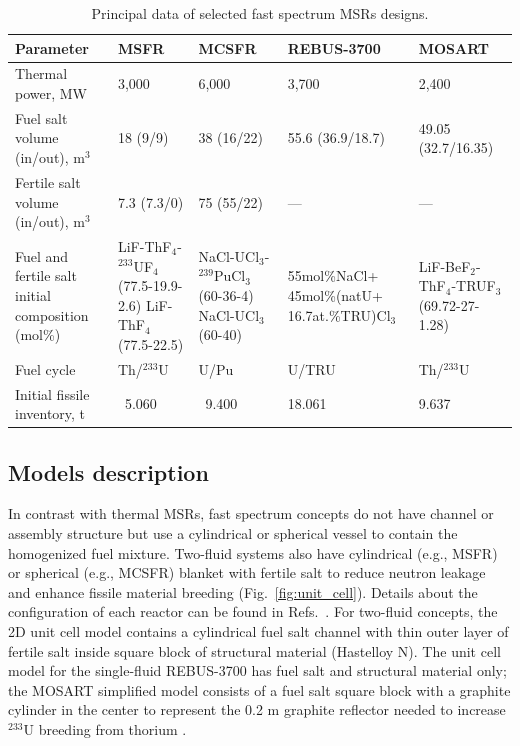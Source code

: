 \documentclass{anstrans}
\begin{document}
\begin{table}[!htb]
	\vspace{-0.15in}
  \centering
  \caption{Principal data of selected fast spectrum \glspl{MSR} designs.}
  \label{table:fsmsr_concepts} 
  \begin{tabular}{p{} p{} p{} p{} p{}} \toprule 
   Parameter & \gls{MSFR} & \gls{MCSFR} & REBUS-3700 & \gls{MOSART} \\ \midrule
   Thermal power, MW 				&  3,000 & 6,000     & 3,700 & 2,400   \\ 
   Fuel salt volume (in/out), m$^3$       &18 (9/9)& 38 (16/22)& 55.6 (36.9/18.7) & 49.05 (32.7/16.35) \\ 
   Fertile salt volume (in/out), m$^3$ & 7.3 (7.3/0) & 75 (55/22)    & --- & --- \\
   Fuel and fertile salt initial composition (mol\%) & LiF-ThF$_4$-$^{233}$UF$_4$ (77.5-19.9-2.6) LiF-ThF$_4$ \newline (77.5-22.5) & NaCl-UCl$_3$-$^{239}$PuCl$_3$ (60-36-4) \newline NaCl-UCl$_3$ \newline (60-40)    
   & 55mol\%NaCl+ 45mol\%(natU+ 16.7at.\%TRU)Cl$_3$ 
   & LiF-BeF$_2$-ThF$_4$-TRUF$_3$  \newline (69.72-27-1.28) \\
   Fuel cycle & Th/$^{233}$U & U/Pu  & U/TRU & Th/$^{233}$U \\
   Initial fissile inventory, t & \ 5.060 & \ 9.400    & 18.061 & 9.637 \\ \bottomrule 
   \end{tabular}
   \vspace{-0.2in}
\end{table}

\subsection{Models description} 
\label{sec:model}
In contrast with thermal \gls{MSR}s, fast spectrum concepts do not have channel or assembly structure but use a cylindrical or spherical vessel to contain the homogenized fuel mixture. Two-fluid systems also have cylindrical (e.g., \gls{MSFR}) or spherical (e.g., \gls{MCSFR}) blanket with fertile salt to reduce neutron leakage and enhance fissile material breeding (Fig.~\ref{fig:unit_cell}). Details about the configuration of each reactor can be found in Refs.~\cite{noauthor_final_2015, simmons_assessment_1974, mourogov_potentialities_2006,ignatiev_molten_2014}. For two-fluid concepts, the 2D unit cell model contains a cylindrical fuel salt channel with thin outer layer of fertile salt inside square block of structural material (Hastelloy N). The unit cell model for the single-fluid REBUS-3700 has fuel salt and structural material only; the \gls{MOSART} simplified model consists of a fuel salt square block with a graphite cylinder in the center to represent the 0.2 m graphite reflector needed to increase $^{233}$U breeding from thorium \cite{anshuman_chaube_arfc/mosart:_2018}. 
\end{document}
